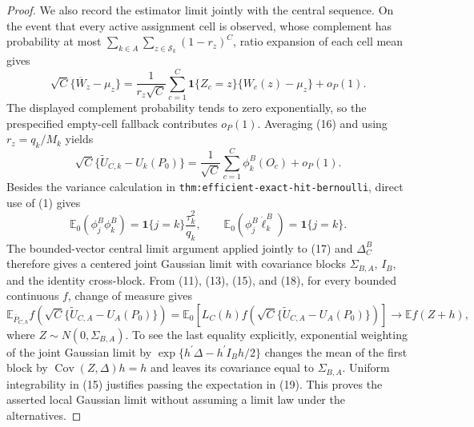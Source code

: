 \documentclass{article}
\begin{document}
\begin{proof}
We also record the estimator limit jointly with the central sequence.  On the event that every active assignment cell is observed, whose complement has probability at most \(\sum_{k\in A}\sum_{z\in\mathcal S_k}(1-r_z)^C\), ratio expansion of each cell mean gives
\[
\sqrt C\{\overline W_z-\mu_z\}
=\frac{1}{r_z\sqrt C}\sum_{c=1}^C
\mathbf1\{Z_c=z\}\{W_c(z)-\mu_z\}+o_P(1).
\tag{16}
\]
The displayed complement probability tends to zero exponentially, so the prespecified empty-cell fallback contributes \(o_P(1)\).  Averaging (16) and using \(r_z=q_k/M_k\) yields
\[
\sqrt C\{\widetilde U_{C,k}-U_k(P_0)\}
=\frac1{\sqrt C}\sum_{c=1}^C\phi_k^B(O_c)+o_P(1).
\tag{17}
\]
Besides the variance calculation in \texttt{thm:efficient-exact-hit-bernoulli}, direct use of (1) gives
\[
\mathbb E_0(\phi_j^B\phi_k^B)
=\mathbf1\{j=k\}\frac{\tau_k^2}{q_k},
\qquad
\mathbb E_0(\phi_j^B\dot\ell_k^B)=\mathbf1\{j=k\}.
\tag{18}
\]
The bounded-vector central limit argument applied jointly to (17) and \(\Delta_C^B\) therefore gives a centered joint Gaussian limit with covariance blocks \(\Sigma_{B,A}\), \(I_B\), and the identity cross-block.  From (11), (13), (15), and (18), for every bounded continuous \(f\), change of measure gives
\[
\mathbb E_{\bar P_{C,h}}f\!\left(\sqrt C\{\widetilde U_{C,A}-U_A(P_0)\}\right)
=\mathbb E_0\!\left[L_C(h)f\!\left(\sqrt C\{\widetilde U_{C,A}-U_A(P_0)\}\right)\right]
\longrightarrow
\mathbb E f(Z+h),
\tag{19}
\]
where \(Z\sim N(0,\Sigma_{B,A})\).  To see the last equality explicitly, exponential weighting of the joint Gaussian limit by \(\exp\{h^{\prime}\Delta-h^{\prime}I_Bh/2\}\) changes the mean of the first block by \(\operatorname{Cov}(Z,\Delta)h=h\) and leaves its covariance equal to \(\Sigma_{B,A}\).  Uniform integrability in (15) justifies passing the expectation in (19).  This proves the asserted local Gaussian limit without assuming a limit law under the alternatives.


\end{proof}
\end{document}
